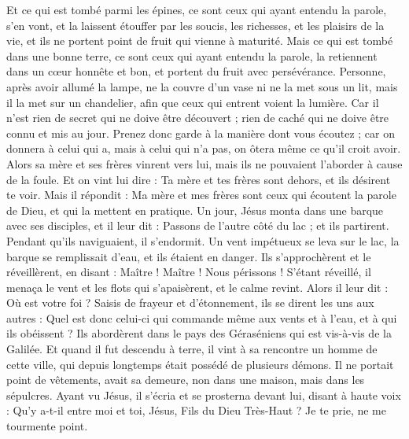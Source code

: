\begin{multicols}{2}
Et ce qui est tombé parmi les épines, ce sont ceux qui ayant entendu la parole, s'en vont, et la laissent étouffer par les soucis, les richesses, et les plaisirs de la vie, et ils ne portent point de fruit qui vienne à maturité.
Mais ce qui est tombé dans une bonne terre, ce sont ceux qui ayant entendu la parole, la retiennent dans un cœur honnête et bon, et portent du fruit avec persévérance.
Personne, après avoir allumé la lampe, ne la couvre d'un vase ni ne la met sous un lit, mais il la met sur un chandelier, afin que ceux qui entrent voient la lumière.
Car il n’est rien de secret qui ne doive être découvert ; rien de caché qui ne doive être connu et mis au jour.
Prenez donc garde à la manière dont vous écoutez ; car on donnera à celui qui a, mais à celui qui n’a pas, on ôtera même ce qu’il croit avoir.
Alors sa mère et ses frères vinrent vers lui, mais ils ne pouvaient l'aborder à cause de la foule.
Et on vint lui dire : Ta mère et tes frères sont dehors, et ils désirent te voir.
Mais il répondit : Ma mère et mes frères sont ceux qui écoutent la parole de Dieu, et qui la mettent en pratique.
Un jour, Jésus monta dans une barque avec ses disciples, et il leur dit : Passons de l'autre côté du lac ; et ils partirent.
Pendant qu’ils naviguaient, il s'endormit. Un vent impétueux se leva sur le lac, la barque se remplissait d'eau, et ils étaient en danger.
Ils s’approchèrent et le réveillèrent, en disant : Maître ! Maître ! Nous périssons ! S’étant réveillé, il menaça le vent et les flots qui s'apaisèrent, et le calme revint.
Alors il leur dit : Où est votre foi ? Saisis de frayeur et d’étonnement, ils se dirent les uns aux autres : Quel est donc celui-ci qui commande même aux vents et à l'eau, et à qui ils obéissent ?
Ils abordèrent dans le pays des Géraséniens qui est vis-à-vis de la Galilée.
Et quand il fut descendu à terre, il vint à sa rencontre un homme de cette ville, qui depuis longtemps était possédé de plusieurs démons. Il ne portait point de vêtements, avait sa demeure, non dans une maison, mais dans les sépulcres.
Ayant vu Jésus, il s'écria et se prosterna devant lui, disant à haute voix : Qu'y a-t-il entre moi et toi, Jésus, Fils du Dieu Très-Haut ? Je te prie, ne me tourmente point.

\end{multicols}
